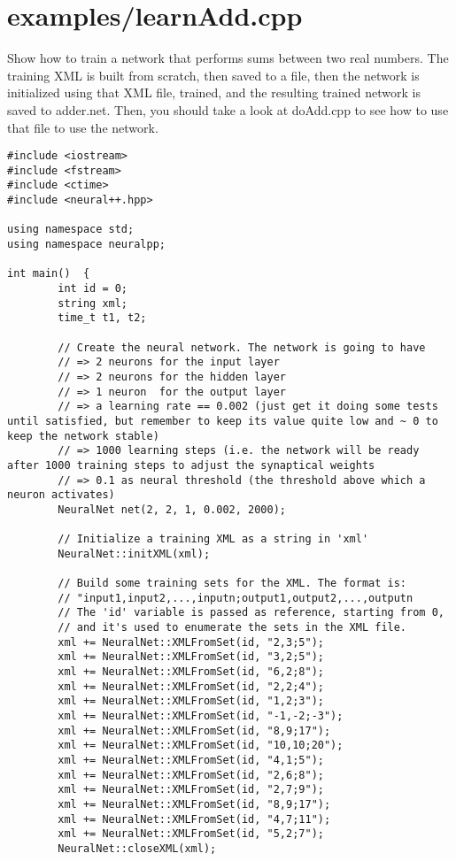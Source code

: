 \section{examples/learnAdd.cpp}
Show how to train a network that performs sums between two real numbers. The training XML is built from scratch, then saved to a file, then the network is initialized using that XML file, trained, and the resulting trained network is saved to adder.net. Then, you should take a look at doAdd.cpp to see how to use that file to use the network.



\begin{DocInclude}\begin{verbatim}
#include <iostream>
#include <fstream>
#include <ctime>
#include <neural++.hpp>

using namespace std;
using namespace neuralpp;

int main()  {
        int id = 0;
        string xml;
        time_t t1, t2;

        // Create the neural network. The network is going to have
        // => 2 neurons for the input layer
        // => 2 neurons for the hidden layer
        // => 1 neuron  for the output layer
        // => a learning rate == 0.002 (just get it doing some tests until satisfied, but remember to keep its value quite low and ~ 0 to keep the network stable)
        // => 1000 learning steps (i.e. the network will be ready after 1000 training steps to adjust the synaptical weights
        // => 0.1 as neural threshold (the threshold above which a neuron activates)
        NeuralNet net(2, 2, 1, 0.002, 2000);

        // Initialize a training XML as a string in 'xml'
        NeuralNet::initXML(xml);

        // Build some training sets for the XML. The format is:
        // "input1,input2,...,inputn;output1,output2,...,outputn
        // The 'id' variable is passed as reference, starting from 0,
        // and it's used to enumerate the sets in the XML file.
        xml += NeuralNet::XMLFromSet(id, "2,3;5");
        xml += NeuralNet::XMLFromSet(id, "3,2;5");
        xml += NeuralNet::XMLFromSet(id, "6,2;8");
        xml += NeuralNet::XMLFromSet(id, "2,2;4");
        xml += NeuralNet::XMLFromSet(id, "1,2;3");
        xml += NeuralNet::XMLFromSet(id, "-1,-2;-3");
        xml += NeuralNet::XMLFromSet(id, "8,9;17");
        xml += NeuralNet::XMLFromSet(id, "10,10;20");
        xml += NeuralNet::XMLFromSet(id, "4,1;5");
        xml += NeuralNet::XMLFromSet(id, "2,6;8");
        xml += NeuralNet::XMLFromSet(id, "2,7;9");
        xml += NeuralNet::XMLFromSet(id, "8,9;17");
        xml += NeuralNet::XMLFromSet(id, "4,7;11");
        xml += NeuralNet::XMLFromSet(id, "5,2;7");
        NeuralNet::closeXML(xml);


\end{verbatim}
\end{DocInclude}
